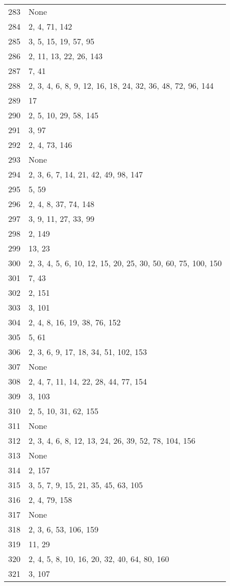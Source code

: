 \documentclass[12pt]{article}
\begin{document}
\begin{tabular}{|r|l|}
283 & None \\ 
284 & 2, 4, 71, 142 \\ 
285 & 3, 5, 15, 19, 57, 95 \\ 
286 & 2, 11, 13, 22, 26, 143 \\ 
287 & 7, 41 \\ 
288 & 2, 3, 4, 6, 8, 9, 12, 16, 18, 24, 32, 36, 48, 72, 96, 144 \\ 
289 & 17 \\ 
290 & 2, 5, 10, 29, 58, 145 \\ 
291 & 3, 97 \\ 
292 & 2, 4, 73, 146 \\ 
293 & None \\ 
294 & 2, 3, 6, 7, 14, 21, 42, 49, 98, 147 \\ 
295 & 5, 59 \\ 
296 & 2, 4, 8, 37, 74, 148 \\ 
297 & 3, 9, 11, 27, 33, 99 \\ 
298 & 2, 149 \\ 
299 & 13, 23 \\ 
300 & 2, 3, 4, 5, 6, 10, 12, 15, 20,  25, 30, 50, 60, 75, 100, 150 \\ 
301 & 7, 43 \\ 
302 & 2, 151 \\ 
303 & 3, 101 \\ 
304 & 2, 4, 8, 16, 19, 38, 76, 152 \\ 
305 & 5, 61 \\ 
306 & 2, 3, 6, 9, 17,  18, 34, 51, 102, 153 \\ 
307 & None \\ 
308 & 2, 4, 7, 11, 14, 22, 28, 44, 77, 154 \\ 
309 & 3, 103 \\ 
310 & 2, 5, 10, 31, 62, 155 \\ 
311 & None \\ 
312 & 2, 3, 4, 6, 8, 12, 13, 24, 26, 39, 52, 78, 104, 156 \\ 
313 & None \\ 
314 & 2, 157 \\ 
315 & 3, 5, 7, 9, 15, 21, 35, 45, 63, 105 \\ 
316 & 2, 4, 79, 158 \\ 
317 & None \\ 
318 & 2, 3, 6, 53, 106, 159 \\ 
319 & 11, 29 \\ 
320 & 2, 4, 5, 8, 10, 16, 20, 32, 40, 64, 80, 160 \\ 
321 & 3, 107 \\ 

\end{tabular}
\end{document}
